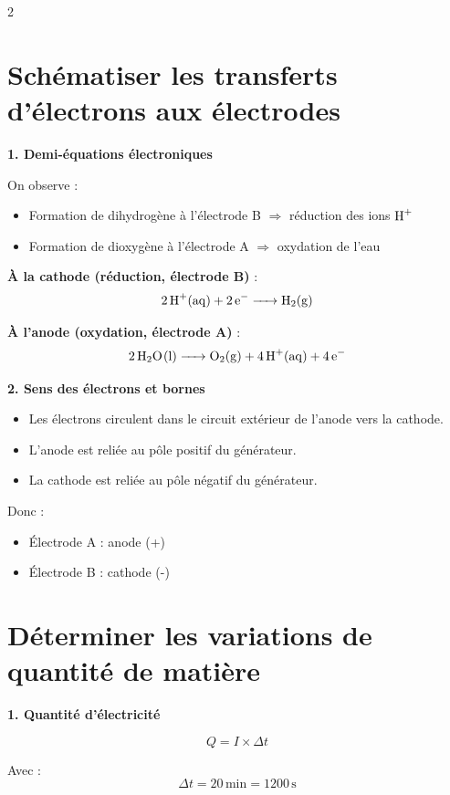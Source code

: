 \documentclass[a4paper,11pt,fleqn]{scrartcl}
\begin{document}
\maketitle
\begin{multicols}{2}

\section{Schématiser les transferts d'électrons aux électrodes}

\textbf{1. Demi-équations électroniques}

On observe :
\begin{itemize}
    \item Formation de dihydrogène à l’électrode B $\Rightarrow$ réduction des ions $\ce{H+}$
    \item Formation de dioxygène à l’électrode A $\Rightarrow$ oxydation de l’eau
\end{itemize}

\textbf{À la cathode (réduction, électrode B)} :
\[
\ce{2H+(aq) + 2e^- -> H2(g)}
\]

\textbf{À l’anode (oxydation, électrode A)} :
\[
\ce{2H2O(l) -> O2(g) + 4H+(aq) + 4e^-}
\]

\textbf{2. Sens des électrons et bornes}

\begin{itemize}
    \item Les électrons circulent dans le circuit extérieur de l’anode vers la cathode.
    \item L’anode est reliée au pôle positif du générateur.
    \item La cathode est reliée au pôle négatif du générateur.
\end{itemize}

Donc :
\begin{itemize}
    \item Électrode A : anode (+)
    \item Électrode B : cathode (-)
\end{itemize}

\section{Déterminer les variations de quantité de matière}

\textbf{1. Quantité d’électricité}

\[
Q = I \times \Delta t
\]

Avec :
\[
\Delta t = 20\,\text{min} = 1200\,\text{s}
\]


\end{multicols}
\end{document}
